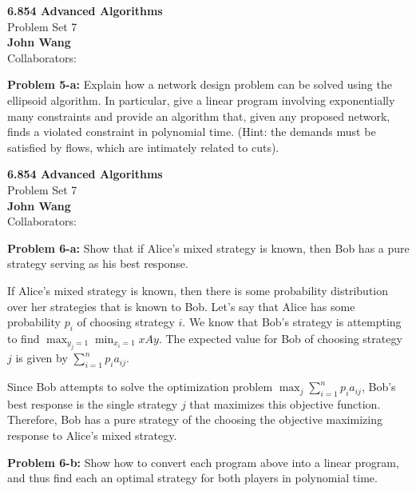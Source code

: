\documentclass[psamsfonts]{amsart}
\newenvironment{sol}{\vspace{0.25cm}{\large \bfseries Solution:}}{\qedsymbol}
\newenvironment{prob}[1]{\begin{framed}{\large \bfseries Problem #1:}}{\end{framed}}
\newcommand{\makenewtitle}{
    \begin{center}
    {\huge \bfseries 6.854 Advanced Algorithms} \\
    Problem Set 7\\
    \vspace{0.25cm}
    {\bfseries John Wang} \\
    Collaborators: 
    \end{center}
    \vspace{0.5cm}
}
\begin{document}
\newpage
\makenewtitle

\begin{prob}{5-a}
Explain how a network design problem can be solved using the ellipsoid algorithm. In particular, give a linear program involving exponentially many constraints and provide an algorithm that, given any proposed network, finds a violated constraint in polynomial time. (Hint: the demands must be satisfied by flows, which are intimately related to cuts).
\end{prob}
\begin{sol}
\end{sol}

\newpage
\makenewtitle

\begin{prob}{6-a}
Show that if Alice's mixed strategy is known, then Bob has a pure strategy serving as his best response.
\end{prob}
\begin{sol}
If Alice's mixed strategy is known, then there is some probability distribution over her strategies that is known to Bob. Let's say that Alice has some probability $p_i$ of choosing strategy $i$. We know that Bob's strategy is attempting to find $\max_{y_j = 1} \min_{x_i = 1} xAy$. The expected value for Bob of choosing strategy $j$ is given by $\sum_{i=1}^n p_i a_{ij}$. 

Since Bob attempts to solve the optimization problem $\max_{j} \sum_{i=1}^n p_i a_{ij}$, Bob's best response is the single strategy $j$ that maximizes this objective function. Therefore, Bob has a pure strategy of the choosing the objective maximizing response to Alice's mixed strategy.
\end{sol}

\begin{prob}{6-b}
Show how to convert each program above into a linear program, and thus find each an optimal strategy for both players in polynomial time.
\end{prob}
\begin{sol}

\end{sol}
\end{document}
